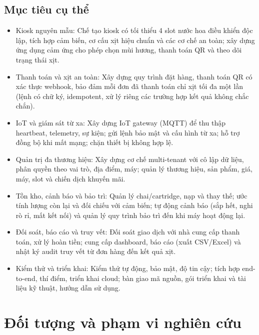 \subsection{Mục tiêu cụ thể}
\begin{itemize}
\item Kiosk nguyên mẫu: Chế tạo kiosk có tối thiểu 4 slot nước hoa điều khiển độc lập, tích hợp cảm biến, cơ cấu xịt hiệu chuẩn và các cơ chế an toàn; xây dựng ứng dụng cảm ứng cho phép chọn mùi hương, thanh toán QR và theo dõi trạng thái xịt.
\item Thanh toán và xịt an toàn: Xây dựng quy trình đặt hàng, thanh toán QR có xác thực webhook, bảo đảm mỗi đơn đã thanh toán chỉ xịt tối đa một lần (lệnh có chữ ký, idempotent, xử lý riêng các trường hợp kết quả không chắc chắn).
\item IoT và giám sát từ xa: Xây dựng IoT gateway (MQTT) để thu thập heartbeat, telemetry, sự kiện; gửi lệnh bảo mật và cấu hình từ xa; hỗ trợ đồng bộ khi mất mạng; chặn thiết bị không hợp lệ.
\item Quản trị đa thương hiệu: Xây dựng cơ chế multi-tenant với cô lập dữ liệu, phân quyền theo vai trò, địa điểm, máy; quản lý thương hiệu, sản phẩm, giá, máy, slot và chiến dịch khuyến mãi.
\item Tồn kho, cảnh báo và bảo trì: Quản lý chai/cartridge, nạp và thay thế; ước tính lượng còn lại và đối chiếu với cảm biến; tự động cảnh báo (sắp hết, nghi rò rỉ, mất kết nối) và quản lý quy trình bảo trì đến khi máy hoạt động lại.
\item Đối soát, báo cáo và truy vết: Đối soát giao dịch với nhà cung cấp thanh toán, xử lý hoàn tiền; cung cấp dashboard, báo cáo (xuất CSV/Excel) và nhật ký audit truy vết từ đơn hàng đến kết quả xịt.
\item Kiểm thử và triển khai: Kiểm thử tự động, bảo mật, độ tin cậy; tích hợp end-to-end, thí điểm, triển khai cloud; bàn giao mã nguồn, gói triển khai và tài liệu kỹ thuật, hướng dẫn sử dụng.
\end{itemize}
\section{Đối tượng và phạm vi nghiên cứu}


